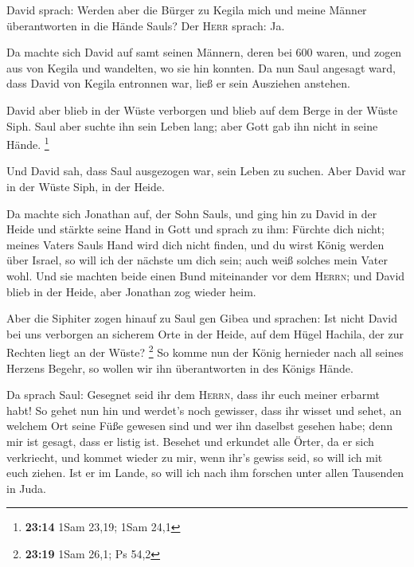  David sprach: Werden aber die Bürger zu Kegila mich und
meine Männer überantworten in die Hände Sauls? Der \textsc{Herr} sprach:
Ja.

 Da machte sich David auf samt seinen Männern, deren bei
600 waren, und zogen aus von Kegila und wandelten, wo sie hin konnten.
Da nun Saul angesagt ward, dass David von Kegila entronnen war, ließ er
sein Ausziehen anstehen.

 David aber blieb in der Wüste verborgen und blieb auf
dem Berge in der Wüste Siph. Saul aber suchte ihn sein Leben lang; aber
Gott gab ihn nicht in seine Hände. \footnote{\textbf{23:14} 1Sam 23,19;
  1Sam 24,1}

 Und David sah, dass Saul ausgezogen war, sein Leben zu
suchen. Aber David war in der Wüste Siph, in der Heide.

 Da machte sich Jonathan auf, der Sohn Sauls, und ging
hin zu David in der Heide und stärkte seine Hand in Gott 
und sprach zu ihm: Fürchte dich nicht; meines Vaters Sauls Hand wird
dich nicht finden, und du wirst König werden über Israel, so will ich
der nächste um dich sein; auch weiß solches mein Vater wohl.
 Und sie machten beide einen Bund miteinander vor dem
\textsc{Herrn}; und David blieb in der Heide, aber Jonathan zog wieder
heim.

 Aber die Siphiter zogen hinauf zu Saul gen Gibea und
sprachen: Ist nicht David bei uns verborgen an sicherem Orte in der
Heide, auf dem Hügel Hachila, der zur Rechten liegt an der Wüste?
\footnote{\textbf{23:19} 1Sam 26,1; Ps 54,2}  So komme
nun der König hernieder nach all seines Herzens Begehr, so wollen wir
ihn überantworten in des Königs Hände.

 Da sprach Saul: Gesegnet seid ihr dem \textsc{Herrn},
dass ihr euch meiner erbarmt habt!  So gehet nun hin und
werdet's noch gewisser, dass ihr wisset und sehet, an welchem Ort seine
Füße gewesen sind und wer ihn daselbst gesehen habe; denn mir ist
gesagt, dass er listig ist.  Besehet und erkundet alle
Örter, da er sich verkriecht, und kommet wieder zu mir, wenn ihr's
gewiss seid, so will ich mit euch ziehen. Ist er im Lande, so will ich
nach ihm forschen unter allen Tausenden in Juda.

